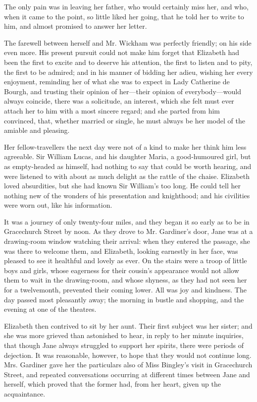 The only pain was in leaving her father, who would certainly miss her, and who, when it came to the point, so little liked her going, that he told her to write to him, and almost promised to answer her letter.

The farewell between herself and Mr. Wickham was perfectly friendly; on his side even more. His present pursuit could not make him forget that Elizabeth had been the first to excite and to deserve his attention, the first to listen and to pity, the first to be admired; and in his manner of bidding her adieu, wishing her every enjoyment, reminding her of what she was to expect in Lady Catherine de Bourgh, and trusting their opinion of her---their opinion of everybody---would always coincide, there was a solicitude, an interest, which she felt must ever attach her to him with a most sincere regard; and she parted from him convinced, that, whether married or single, he must always be her model of the amiable and pleasing.

Her fellow-travellers the next day were not of a kind to make her think him less agreeable. Sir William Lucas, and his daughter Maria, a good-humoured girl, but as empty-headed as himself, had nothing to say that could be worth hearing, and were listened to with about as much delight as the rattle of the chaise. Elizabeth loved absurdities, but she had known Sir William's too long. He could tell her nothing new of the wonders of his presentation and knighthood; and his civilities were worn out, like his information.

It was a journey of only twenty-four miles, and they began it so early as to be in Gracechurch Street by noon. As they drove to Mr. Gardiner's door, Jane was at a drawing-room window watching their arrival: when they entered the passage, she was there to welcome them, and Elizabeth, looking earnestly in her face, was pleased to see it healthful and lovely as ever. On the stairs were a troop of little boys and girls, whose eagerness for their cousin's appearance would not allow them to wait in the drawing-room, and whose shyness, as they had not seen her for a twelvemonth, prevented their coming lower. All was joy and kindness. The day passed most pleasantly away; the morning in bustle and shopping, and the evening at one of the theatres.

Elizabeth then contrived to sit by her aunt. Their first subject was her sister; and she was more grieved than astonished to hear, in reply to her minute inquiries, that though Jane always struggled to support her spirits, there were periods of dejection. It was reasonable, however, to hope that they would not continue long. Mrs. Gardiner gave her the particulars also of Miss Bingley's visit in Gracechurch Street, and repeated conversations occurring at different times between Jane and herself, which proved that the former had, from her heart, given up the acquaintance.

